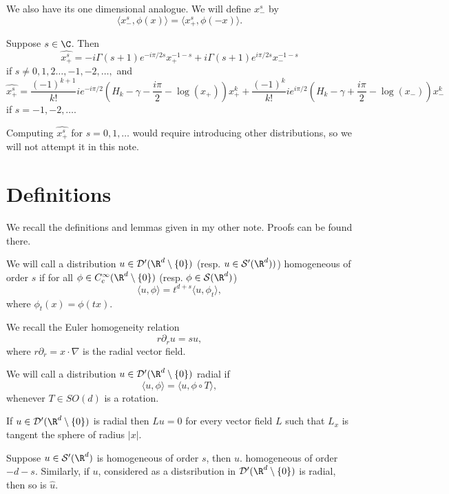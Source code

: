 \documentclass[12pt]{article}
\begin{document}
We also have its one dimensional analogue. We will define $x_-^s$ by
\[\langle x_-^s,\phi(x)\rangle = \langle x_+^s,\phi(-x)\rangle.\]
\begin{thm}\label{bFT}Suppose $s \in \C$. Then 
\[\widehat{x_+^s} = -i\Gamma(s+1)e^{-i\pi/2 s}x_+^{-1-s} + i\Gamma(s+1)e^{i\pi/2s}x_-^{-1-s}\] if $s \neq 0,1,2\ldots,-1,-2,\ldots,$ and
\[\widehat{x_+^s} =\frac{(-1)^{k+1}}{k!}ie^{-i\pi/2}\left(H_k-\gamma-\frac{i\pi}{2}-\log(x_+)\right)x_+^k + \frac{(-1)^{k}}{k!}ie^{i\pi/2}\left(H_k-\gamma+\frac{i\pi}{2}-\log(x_-)\right)x_-^{k}\] if $s = -1,-2,\ldots$.\end{thm}
 Computing $\widehat{x_+^s}$ for $s = 0,1,\ldots$ would require introducing other distributions, so we will not attempt it in this note.

\section{Definitions}
We recall the definitions and lemmas given in my other note. Proofs can be found there.

\begin{defn} We will call a distribution $u \in \mathcal D'(\R^d\setminus\{0\})$ (resp. $u \in \mathcal S'(\R^d))$) homogeneous of order $s$ if for all $\phi \in C_c^\infty(\R^d\setminus\{0\})$ (resp. $\phi \in \mathcal S(\R^d)$)
\[\langle u,\phi\rangle = t^{d+s}\langle u,\phi_t\rangle,\]
where $\phi_t(x) = \phi(tx)$. \end{defn} 
We recall the Euler homogeneity relation
\begin{equation}\label{Euler}r\partial_r u = s u,\end{equation}
where $r\partial_r = x\cdot\nabla$ is the radial vector field.
\begin{defn}We will call a distribution $u \in \mathcal D'(\R^d\setminus\{0\})$ radial if
\[\langle u,\phi\rangle = \langle u, \phi\circ T\rangle,\]
whenever $T \in SO(d)$ is a rotation.\end{defn}
\begin{lem}
If $u \in \mathcal D'(\R^d\setminus\{0\})$ is radial then $Lu = 0$ for every vector field $L$ such that $L_x$ is tangent the sphere of radius $|x|$.\end{lem}
\begin{prop}Suppose $u \in \mathcal S'(\R^d)$ is homogeneous of order $s$, then $\widehat{u}$. homogeneous of order $-d-s$. Similarly, if $u$, considered as a distsribution in $\mathcal D'(\R^d\setminus\{0\})$ is radial, then so is $\widehat{u}$.\end{prop}
\end{document}

